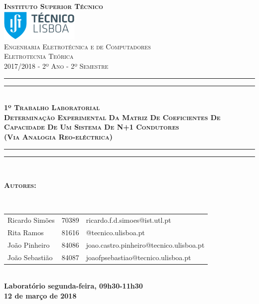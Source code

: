\documentclass[portuguese, a4paper, titlepage]{article}
\begin{document}
	\hypersetup{pageanchor=false}
	\begin{titlepage}
		\center
		\textsc{\bfseries\LARGE Instituto Superior Técnico}\\[1cm] %
		\includegraphics[height=1.5cm]{IST_Logo.pdf}\\[2.5cm]

		\textsc{\large Engenharia Eletrotécnica e de Computadores}\\[0.5cm] %
		\textsc{\Large Eletrotecnia Teórica}\\[0.5cm] %
		\textsc{\large 2017/2018 - 2º Ano - 2º Semestre}\\[2cm]

		\rule{\textwidth}{1.6pt}\vspace*{-\baselineskip}\vspace*{2pt} %
		\rule{\textwidth}{0.4pt}\\[\baselineskip] %
			\textsc{\Huge \bfseries 1º Trabalho Laboratorial}\\[0.2cm]
			\bigskip
			\textsc{\large \bfseries Determinação Experimental Da Matriz De Coeficientes De Capacidade De Um Sistema De N+1 Condutores \\ (Via Analogia Reo-eléctrica)}\\[0.2cm]
		\rule{\textwidth}{0.4pt}\vspace*{-\baselineskip}\vspace{3.2pt} %
		\rule{\textwidth}{1.6pt}\\[5cm]

		\begin{minipage}{0.9\textwidth}
			\begin{flushleft} \large
				\begin{Large}\bfseries\textsc{Autores:}\end{Large}\\[0.4cm]
				\begin{tabular}{l l l}
					Ricardo Simões			& 70389 & \normalsize ricardo.f.d.simoes@ist.utl.pt \\
					Rita Ramos					& 81616 & \normalsize	@tecnico.ulisboa.pt \\
					João Pinheiro				& 84086 & \normalsize joao.castro.pinheiro@tecnico.ulisboa.pt \\
					João Sebastião			& 84087 & \normalsize joaofpsebastiao@tecnico.ulisboa.pt \\
				\end{tabular}
			\end{flushleft}
		\end{minipage}\\[0.5cm]

		\large \bfseries Laboratório segunda-feira, 09h30-11h30\\
		\large 12 de março de 2018\\[1cm]
	\end{titlepage}
	\hypersetup{pageanchor=true}
\end{document}

